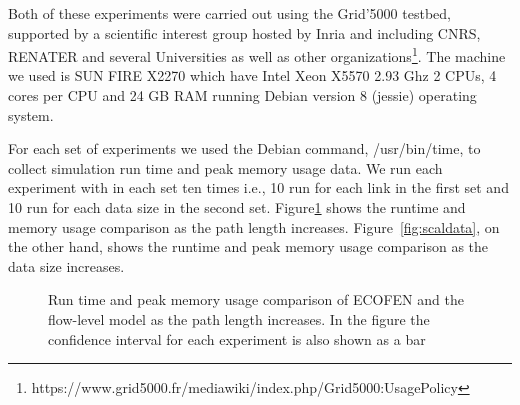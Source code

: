 Both of these experiments were carried out using the Grid'5000 testbed, supported by a scientific interest group hosted by Inria and including CNRS, RENATER and several Universities as well as other organizations\footnote{https://www.grid5000.fr/mediawiki/index.php/Grid5000:UsagePolicy}. The machine we used is SUN FIRE X2270 which have Intel Xeon X5570 2.93 Ghz 2 CPUs, 4 cores per CPU and 24 GB RAM running Debian version 8 (jessie) operating system.

For each set of experiments we used the Debian command, /usr/bin/time, to collect simulation run time and peak memory usage data. We run each experiment with in each set ten times i.e., 10 run for each link in the first set and 10 run for each data size in the second set. Figure\ref{fig:scallinks} shows the runtime and memory usage comparison as the path length increases. Figure~\ref{fig:scaldata}, on the other hand, shows the runtime and peak memory usage comparison as the data size increases.

\begin{figure}[ht]
	\centering
	\centering
	\caption{Run time and peak memory usage comparison of ECOFEN and the flow-level model as the path length increases. In the figure the confidence interval for each experiment is also shown as a bar}
	\label{fig:scallinks}
\end{figure}

